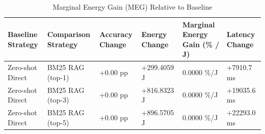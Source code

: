 \begin{table}
\caption{Marginal Energy Gain (MEG) Relative to Baseline}
\label{tab:marginal_energy_gain}
\begin{tabular}{llllll}
\toprule
Baseline Strategy & Comparison Strategy & Accuracy Change & Energy Change & Marginal Energy Gain (\% / J) & Latency Change \\
\midrule
Zero-shot Direct & BM25 RAG (top-1) & +0.00 pp & +299.4059 J & 0.0000 \%/J & +7910.7 ms \\
Zero-shot Direct & BM25 RAG (top-3) & +0.00 pp & +816.8323 J & 0.0000 \%/J & +19035.6 ms \\
Zero-shot Direct & BM25 RAG (top-5) & +0.00 pp & +896.5705 J & 0.0000 \%/J & +22293.0 ms \\
\bottomrule
\end{tabular}
\end{table}
